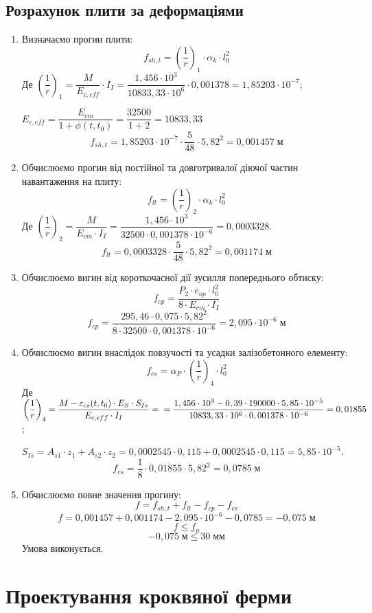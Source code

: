 \documentclass[a4paper,14pt]{article}
\begin{document}
\subsection{Розрахунок плити за деформаціями}
\begin{enumerate}
    \item Визначаємо прогин плити:
        \begin{equation}
            f_{sh,t} = \left(\dfrac{1}{r}\right)_1 \cdot \alpha_k \cdot l_0^2
        \end{equation}
        Де $\left(\dfrac{1}{r}\right)_1 = \dfrac{M}{E_{c,eff}} \cdot I_I = \dfrac{1,456 \cdot 10^3}{10833,33 \cdot 10^6} \cdot 0,001378 = 1,85203 \cdot 10^{-7}$;

        $E_{c,eff} = \dfrac{E_{cm}}{1 + \phi(t,t_0)} = \dfrac{32500}{1 + 2} = 10833,33$
        $$f_{sh,t} = 1,85203 \cdot 10^{-7} \cdot \dfrac{5}{48} \cdot 5,82^2 = 0,001457\;\textit{м}$$
    \item Обчислюємо прогин від постійної та довготривалої діючої частин навантаження на плиту:
        \begin{equation}
            f_{lt} = \left(\dfrac{1}{r}\right)_2 \cdot \alpha_k \cdot l_0^2
        \end{equation}    
        Де $\left(\dfrac{1}{r}\right)_2 = \dfrac{M}{E_{cm} \cdot I_I} = \dfrac{1,456 \cdot 10^3}{32500 \cdot 0,001378 \cdot 10^{-6}} = 0,0003328$.
        $$f_{lt} = 0,0003328 \cdot \dfrac{5}{48} \cdot 5,82^2 = 0,001174\;\textit{м}$$
    \item Обчислюємо вигин від короткочасної дії зусилля попереднього обтиску:
        \begin{equation}
            f_{cp} = \dfrac{P_2 \cdot e_{op} \cdot l_0^2}{8 \cdot E_{cm} \cdot I_I}
        \end{equation}
        $$f_{cp} = \dfrac{295,46 \cdot 0,075 \cdot 5,82^2}{8 \cdot 32500 \cdot 0,001378 \cdot 10^{-6}} = 2,095 \cdot 10^{-6}\;\textit{м}$$
    \item Обчислюємо вигин внаслідок повзучості та усадки залізобетонного елементу:
        \begin{equation}
            f_{cs} = \alpha_P \cdot \left(\dfrac{1}{r}\right)_4 \cdot l_0^2
        \end{equation}
        Де $\left(\dfrac{1}{r}\right)_4 = \dfrac{M - \epsilon_{cs}(t,t_0) \cdot E_S \cdot S_{Is}}{E_{c,eff} \cdot I_I} =\\= \dfrac{1,456 \cdot 10^3 - 0,39 \cdot 190000 \cdot 5,85 \cdot 10^{-5}}{10833,33 \cdot 10^6 \cdot 0,001378 \cdot 10^{-6}} = 0,01855$;

        $S_{Is} = A_{s1} \cdot z_1 + A_{s2} \cdot z_2 = 0,0002545 \cdot 0,115 + 0,0002545 \cdot 0,115 = 5,85 \cdot 10^{-5}$.
        $$f_{cs} = \dfrac{1}{8} \cdot 0,01855 \cdot 5,82^2 = 0,0785\;\textit{м}$$
    \item Обчислюємо повне значення прогину:
        \begin{equation}
            f = f_{sh,t} + f_{lt} - f_{cp} - f_{cs}
        \end{equation}
        $$f = 0,001457 + 0,001174 - 2,095 \cdot 10^{-6} - 0,0785 = -0,075\;\textit{м}$$
        $$f \leq f_u$$
        $$-0,075\;\textit{м} \leq 30\;\textit{мм}$$
        Умова виконується.
\end{enumerate}
\newpage
\section{Проектування кроквяної ферми}
\end{document}
